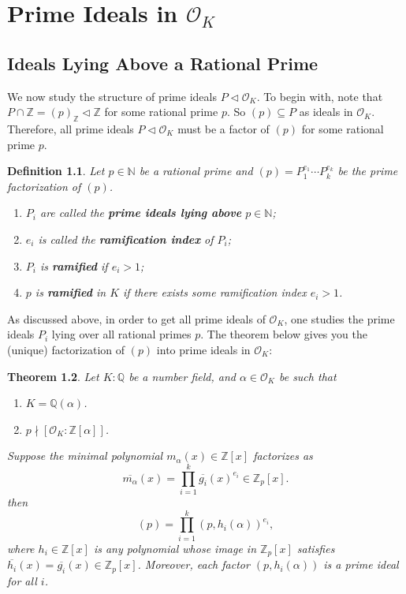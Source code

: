 \documentclass[11pt]{book}
\newtheorem{theorem}{Theorem}[section]
\newtheorem{definition}[theorem]{Definition}
\begin{document}
\chapter{Prime Ideals in $\mathcal{O}_{K}$}
\section{Ideals Lying Above a Rational Prime}
We now study the structure of prime ideals $P\lhd \mathcal{O}_{K}$. To begin with, note that $P\cap \mathbb{Z}=(p)_{\mathbb{Z}}\lhd \mathbb{Z}$ for some rational prime $p$. So $(p)\subseteq P$ as ideals in $\mathcal{O}_{K}$. Therefore, all prime ideals $P\lhd \mathcal{O}_{K}$ must be a factor of $(p)$ for some rational prime $p$. 

\begin{definition}
    Let $p\in \mathbb{N}$ be a rational prime and $(p)=P_{1}^{e_{1}}\cdots P_{k}^{e_{k}}$ be the prime factorization of $(p)$. 
    \begin{enumerate}
        \item $P_{i}$ are called the {\bf prime ideals lying above} $p\in \mathbb{N}$; 
        \item $e_{i}$ is called the {\bf ramification index} of $P_{i}$;
        \item $P_{i}$ is {\bf ramified} if $e_{i}>1$;
        \item $p$ is {\bf ramified} in $K$ if there exists some ramification index $e_{i}>1$. 
    \end{enumerate}
\end{definition}

As discussed above, in order to get all prime ideals of $\mathcal{O}_K$, one studies the prime ideals $P_i$ lying over all rational primes $p$. The theorem below gives you the (unique) factorization of $(p)$ into prime ideals in $\mathcal{O}_K$:
\begin{theorem}\label{thm-factorizationOfRationalPrimes}
    Let $K:\mathbb{Q}$ be a number field, and $\alpha\in \mathcal{O}_{K}$ be such that
    \begin{enumerate}
        \item $K=\mathbb{Q}(\alpha)$. 
        \item $p\nmid [\mathcal{O}_{K}:\mathbb{Z}[\alpha]]$. 
    \end{enumerate}
    Suppose the minimal polynomial $m_{\alpha}(x)\in \mathbb{Z}[x]$ factorizes as 
        \[
        \overline{m_{\alpha}}(x)=\prod_{i=1}^{k}\overline{g_{i}}(x)^{e_{i}}\in \mathbb{Z}_{p}[x]. 
        \]then 
    \[
    (p)=\prod_{i=1}^{k}(p,h_{i}(\alpha))^{e_{i}},
    \]
    where $h_{i}\in \mathbb{Z}[x]$ is any polynomial whose image in $\mathbb{Z}_{p}[x]$ satisfies $\overline{h_{i}}(x)=\overline{g_{i}}(x)\in \mathbb{Z}_{p}[x]$. Moreover, each factor $(p,h_{i}(\alpha))$ is a prime ideal for all $i$. 
\end{theorem} 
\end{document}
